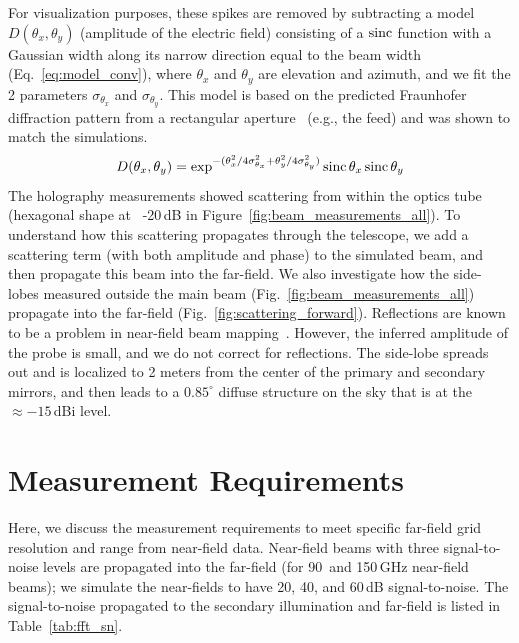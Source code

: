 For visualization purposes, these spikes are removed by subtracting a model $D(\theta_x,\theta_y)$ (amplitude of the electric field) consisting of a $\operatorname{sinc}$ function with a Gaussian width along its narrow direction equal to the beam width (Eq.~\ref{eq:model_conv}), where $\theta_x$ and $\theta_y$ are elevation and azimuth, and we fit the 2 parameters $\sigma_{\theta_x}$ and $\sigma_{\theta_y}$.  This model is based on the predicted Fraunhofer diffraction pattern from a rectangular aperture~\cite{Goodman2005-ne} (e.g., the feed) and was shown to match the simulations.
\begin{equation}
    D(\theta_x,\theta_y) = \exp^{-(\theta_x^2/4\sigma_{\theta_x}^2 +\theta_y^2/4\sigma_{\theta_y}^2 )}\operatorname{sinc}{\theta_x}\operatorname{sinc}{\theta_y}
    \label{eq:model_conv}
\end{equation}
The holography measurements showed scattering from within the optics tube (hexagonal shape at ~-20\,dB in Figure~\ref{fig:beam_measurements_all}).  To understand how this scattering propagates through the telescope, we add a scattering term (with both amplitude and phase) to the simulated beam, and then propagate this beam into the far-field.  We also investigate how the side-lobes measured outside the main beam (Fig.~\ref{fig:beam_measurements_all}) propagate into the far-field (Fig.~\ref{fig:scattering_forward}).  Reflections are known to be a problem in near-field beam mapping~\cite{2020JLTP..199..156Y,7740846,387181}.  However, the inferred amplitude of the probe is small, and we do not correct for reflections.  The side-lobe spreads out and is localized to 2 meters from the center of the primary and secondary mirrors, and then leads to a $0.85^{\circ}$ diffuse structure on the sky that is at the $\approx -15$\,dBi level.

\section{Measurement Requirements}
\label{sec:err_prop}
Here, we discuss the measurement requirements to meet specific far-field grid resolution and range from near-field data.  Near-field beams with three signal-to-noise levels are propagated into the far-field (for 90\, and 150\,GHz near-field beams); we simulate the near-fields to have 20, 40, and 60\,dB signal-to-noise.  The signal-to-noise propagated to the secondary illumination and far-field is listed in Table~\ref{tab:fft_sn}. 

